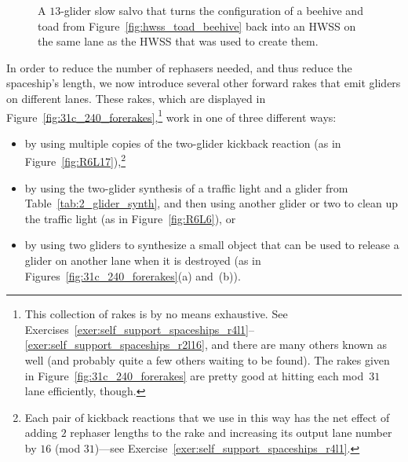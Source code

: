 \begin{figure}[!htb]
	\centering{} 
	\caption{A $13$-glider slow salvo that turns the configuration of a beehive and toad from Figure~\ref{fig:hwss_toad_beehive} back into an HWSS on the same lane as the HWSS that was used to create them.}\label{fig:hwss_from_toad_beehive}
\end{figure}

In order to reduce the number of rephasers needed, and thus reduce the spaceship's length, we now introduce several other forward rakes that emit gliders on different lanes. These rakes, which are displayed in Figure~\ref{fig:31c_240_forerakes},\footnote{This collection of rakes is by no means exhaustive. See Exercises~\ref{exer:self_support_spaceships_r4l1}--\ref{exer:self_support_spaceships_r2l16}, and there are many others known as well (and probably quite a few others waiting to be found). The rakes given in Figure~\ref{fig:31c_240_forerakes} are pretty good at hitting each mod~$31$ lane efficiently, though.} work in one of three different ways:\smallskip

\begin{itemize}
	\item by using multiple copies of the two-glider kickback reaction (as in Figure~\ref{fig:R6L17}),\footnote{Each pair of kickback reactions that we use in this way has the net effect of adding $2$ rephaser lengths to the rake and increasing its output lane number by $16$ (mod $31$)---see Exercise~\ref{exer:self_support_spaceships_r4l1}.}\smallskip
	
	\item by using the two-glider synthesis of a traffic light and a glider from Table~\ref{tab:2_glider_synth}, and then using another glider or two to clean up the traffic light (as in Figure~\ref{fig:R6L6}), or\smallskip
	
	\item by using two gliders to synthesize a small object that can be used to release a glider on another lane when it is destroyed (as in Figures~\ref{fig:31c_240_forerakes}(a) and~(b)).\smallskip
\end{itemize}

